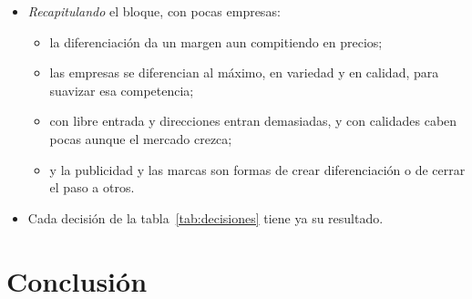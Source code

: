 \documentclass[11pt]{article}
\begin{document}
\begin{itemize}
\item \emph{Recapitulando} el bloque, con pocas empresas:
  \begin{itemize}
  \item la diferenciación da un margen aun compitiendo en precios;
  \item las empresas se diferencian al máximo, en variedad y en calidad, para suavizar esa competencia;
  \item con libre entrada y direcciones entran demasiadas, y con calidades caben pocas aunque el mercado crezca;
  \item y la publicidad y las marcas son formas de crear diferenciación o de cerrar el paso a otros.
  \end{itemize}
\item Cada decisión de la tabla~\ref{tab:decisiones} tiene ya su resultado.
\end{itemize}


\section*{Conclusión}
\end{document}

